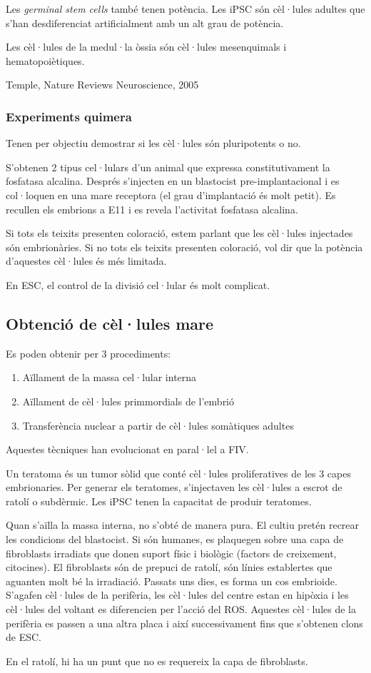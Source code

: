 Les \textit{germinal stem cells} també tenen potència. Les iPSC són cèl·lules adultes que s'han desdiferenciat artificialment amb un alt grau de potència.

Les cèl·lules de la medul·la òssia són cèl·lules mesenquimals i hematopoiètiques.

Temple, Nature Reviews Neuroscience, 2005

\subsubsection{Experiments quimera}
Tenen per objectiu demostrar si les cèl·lules són pluripotents o no.

S'obtenen 2 tipus cel·lulars d'un animal que expressa constitutivament la fosfatasa alcalina. Després s'injecten en un blastocist pre-implantacional i es col·loquen en una mare receptora (el grau d'implantació és molt petit). Es recullen els embrions a E11 i es revela l'activitat fosfatasa alcalina.

Si tots els teixits presenten coloració, estem parlant que les cèl·lules injectades són embrionàries.
Si no tots els teixits presenten coloració, vol dir que la potència d'aquestes cèl·lules és més limitada.

En ESC, el control de la divisió cel·lular és molt complicat.

\subsection{Obtenció de cèl·lules mare}
Es poden obtenir per 3 procediments:
\begin{enumerate}
\item Aïllament de la massa cel·lular interna
\item Aïllament de cèl·lules primmordials de l'embrió
\item Transferència nuclear a partir de cèl·lules somàtiques adultes
\end{enumerate}

Aquestes tècniques han evolucionat en paral·lel a FIV.

Un teratoma és un tumor sòlid que conté cèl·lules proliferatives de les 3 capes embrionaries. Per generar els teratomes, s'injectaven les cèl·lules a escrot de ratolí o subdèrmic. Les iPSC tenen la capacitat de produir teratomes.

Quan s'aïlla la massa interna, no s'obté de manera pura. El cultiu pretén recrear les condicions del blastocist. Si són humanes, es plaquegen sobre una capa de fibroblasts irradiats que donen suport físic i biològic (factors de creixement, citocines). El fibroblasts són de prepuci de ratolí, són línies establertes que aguanten molt bé la irradiació. Passats uns dies, es forma un cos embrioide. S'agafen cèl·lules de la perifèria, les cèl·lules del centre estan en hipòxia i les cèl·lules del voltant es diferencien per l'acció del ROS. Aquestes cèl·lules de la perifèria es passen a una altra placa i així successivament fins que s'obtenen clons de ESC.

En el ratolí, hi ha un punt que no es requereix la capa de fibroblasts.